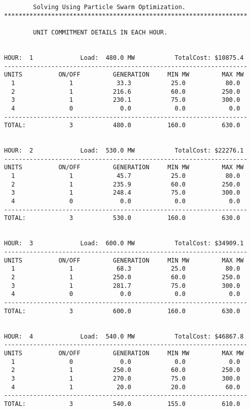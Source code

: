 \begin{verbatim}
		Solving Using Particle Swarm Optimization.
*******************************************************************

		UNIT COMMITMENT DETAILS IN EACH HOUR.


HOUR:  1             Load:  480.0 MW           TotalCost: $10875.4
-------------------------------------------------------------------
UNITS          ON/OFF         GENERATION     MIN MW         MAX MW
  1               1            33.3           25.0           80.0
  2               1           216.6           60.0          250.0
  3               1           230.1           75.0          300.0
  4               0             0.0            0.0            0.0
-------------------------------------------------------------------
TOTAL:            3           480.0          160.0          630.0


HOUR:  2             Load:  530.0 MW           TotalCost: $22276.1
-------------------------------------------------------------------
UNITS          ON/OFF         GENERATION     MIN MW         MAX MW
  1               1            45.7           25.0           80.0
  2               1           235.9           60.0          250.0
  3               1           248.4           75.0          300.0
  4               0             0.0            0.0            0.0
-------------------------------------------------------------------
TOTAL:            3           530.0          160.0          630.0


HOUR:  3             Load:  600.0 MW           TotalCost: $34909.1
-------------------------------------------------------------------
UNITS          ON/OFF         GENERATION     MIN MW         MAX MW
  1               1            68.3           25.0           80.0
  2               1           250.0           60.0          250.0
  3               1           281.7           75.0          300.0
  4               0             0.0            0.0            0.0
-------------------------------------------------------------------
TOTAL:            3           600.0          160.0          630.0


HOUR:  4             Load:  540.0 MW           TotalCost: $46867.8
-------------------------------------------------------------------
UNITS          ON/OFF         GENERATION     MIN MW         MAX MW
  1               0             0.0            0.0            0.0
  2               1           250.0           60.0          250.0
  3               1           270.0           75.0          300.0
  4               1            20.0           20.0           60.0
-------------------------------------------------------------------
TOTAL:            3           540.0          155.0          610.0



\end{verbatim}
